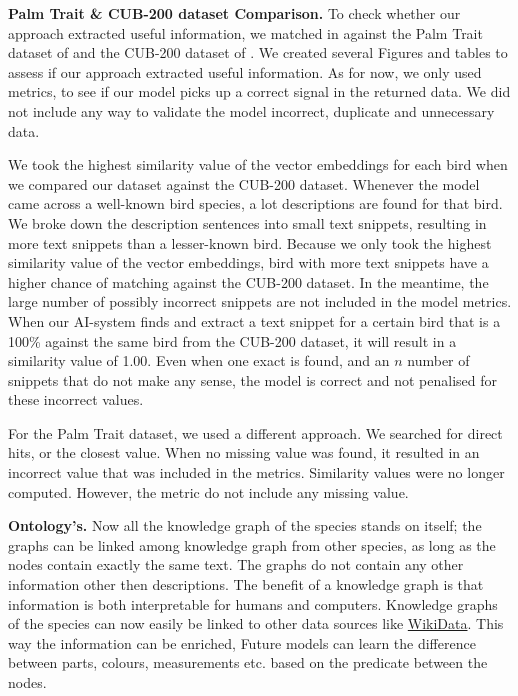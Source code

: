 \documentclass[a4paper, 12pt, oneside]{book} %
\begin{document}
\noindent
\newline
\textbf{Palm Trait \& CUB-200 dataset Comparison.}
To check whether our approach extracted useful information, we matched in against the Palm Trait dataset of \textcite{kissling_palmtraits_2019} and the CUB-200 dataset of \textcite{welinder_caltech-ucsd_2010}.
We created several Figures and tables to assess if our approach extracted useful information.
As for now, we only used metrics, to see if our model picks up a correct signal in the returned data.
We did not include any way to validate the model incorrect, duplicate and unnecessary data.

We took the highest similarity value of the vector embeddings for each bird when we compared our dataset against the CUB-200 dataset.
Whenever the model came across a well-known bird species, a lot descriptions are found for that bird.
We broke down the description sentences into small text snippets, resulting in more text snippets than a lesser-known bird.
Because we only took the highest similarity value of the vector embeddings, bird with more text snippets have a higher chance of matching against the CUB-200 dataset.
In the meantime, the large number of possibly incorrect snippets are not included in the model metrics.
When our AI-system finds and extract a text snippet for a certain bird that is a 100\% against the same bird from the CUB-200 dataset, it will result in a similarity value of 1.00. 
Even when one exact is found, and an $n$ number of snippets that do not make any sense, the model is correct and not penalised for these incorrect values.

For the Palm Trait dataset, we used a different approach.
We searched for direct hits, or the closest value. 
When no missing value was found, it resulted in an incorrect value that was included in the metrics.
Similarity values were no longer computed.
However, the metric do not include any missing value.




\noindent
\newline
\textbf{Ontology's.}
Now all the knowledge graph of the species stands on itself; the graphs can be linked among knowledge graph from other species, as long as the nodes contain exactly the same text.
The graphs do not contain any other information other then descriptions.
The benefit of a knowledge graph is that information is both interpretable for humans and computers.
Knowledge graphs of the species can now easily be linked to other data sources like \href{https://www.wikidata.org/wiki/Wikidata:Main_Page}{WikiData}.
This way the information can be enriched, 
Future models can learn the difference between parts, colours, measurements etc. based on the predicate between the nodes.
\end{document}

